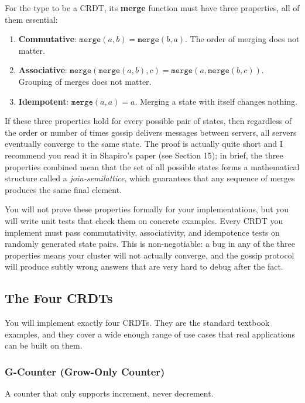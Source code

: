 \documentclass[11pt,a4paper]{article}
\begin{document}
For the type to be a CRDT, its \textbf{merge} function must have three properties, all of them essential:

\begin{enumerate}
\item \textbf{Commutative}: $\texttt{merge}(a, b) = \texttt{merge}(b, a)$. The order of merging does not matter.
\item \textbf{Associative}: $\texttt{merge}(\texttt{merge}(a, b), c) = \texttt{merge}(a, \texttt{merge}(b, c))$. Grouping of merges does not matter.
\item \textbf{Idempotent}: $\texttt{merge}(a, a) = a$. Merging a state with itself changes nothing.
\end{enumerate}

If these three properties hold for every possible pair of states, then regardless of the order or number of times gossip delivers messages between servers, all servers eventually converge to the same state. The proof is actually quite short and I recommend you read it in Shapiro's paper (see Section 15); in brief, the three properties combined mean that the set of all possible states forms a mathematical structure called a \textit{join-semilattice}, which guarantees that any sequence of merges produces the same final element.

You will not prove these properties formally for your implementations, but you will write unit tests that check them on concrete examples. Every CRDT you implement must pass commutativity, associativity, and idempotence tests on randomly generated state pairs. This is non-negotiable: a bug in any of the three properties means your cluster will not actually converge, and the gossip protocol will produce subtly wrong answers that are very hard to debug after the fact.

\subsection{The Four CRDTs}

You will implement exactly four CRDTs. They are the standard textbook examples, and they cover a wide enough range of use cases that real applications can be built on them.

\subsubsection{G-Counter (Grow-Only Counter)}
A counter that only supports increment, never decrement.
\end{document}

